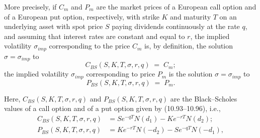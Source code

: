 More precisely, if $C_m$ and $P_m$ are the market prices of a European call option and
of a European put option, respectively, with strike $K$ and maturity $T$ on an
underlying asset with spot price $S$ paying dividends continuously at the rate $q$, and
assuming that interest rates are constant and equal to $r$, the implied volatility
$\sigma_{imp}$ corresponding to the price $C_m$ is, by definition, the solution
$\sigma = \sigma_{imp}$ to
\begin{equation}
C_{BS}(S,K,T,\sigma,r,q) \;=\; C_m;
\end{equation}
the implied volatility $\sigma_{imp}$ corresponding to price $P_m$ is the solution
$\sigma = \sigma_{imp}$ to
\begin{equation}
P_{BS}(S,K,T,\sigma,r,q) \;=\; P_m.
\end{equation}

Here, $C_{BS}(S,K,T,\sigma,r,q)$ and $P_{BS}(S,K,T,\sigma,r,q)$ are the Black--Scholes
values of a call option and of a put option given by (10.93--10.96), i.e.,
\begin{align}
C_{BS}(S,K,T,\sigma,r,q) &= Se^{-qT}N(d_1) - Ke^{-rT}N(d_2); \\
P_{BS}(S,K,T,\sigma,r,q) &= Ke^{-rT}N(-d_2) - Se^{-qT}N(-d_1),
\end{align}
